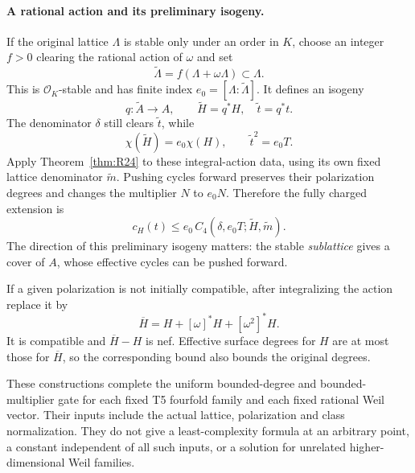 \paragraph{A rational action and its preliminary isogeny.}
If the original lattice $\Lambda$ is stable only under an order in $K$, choose an integer $f>0$ clearing the rational action of $\omega$ and set
\[
\widetilde\Lambda=f(\Lambda+\omega\Lambda)\subset\Lambda.
\]
This is $\mathcal O_K$-stable and has finite index $e_0=[\Lambda:\widetilde\Lambda]$. It defines an isogeny
\[
q:\widetilde A\longrightarrow A,
\qquad \widetilde H=q^*H,\quad\widetilde t=q^*t.
\]
The denominator $\delta$ still clears $\widetilde t$, while
\[
\chi(\widetilde H)=e_0\chi(H),\qquad
\widetilde t^2=e_0T.
\]
Apply Theorem~\ref{thm:R24} to these integral-action data, using its own fixed lattice denominator $\widetilde m$. Pushing cycles forward preserves their polarization degrees and changes the multiplier $N$ to $e_0N$. Therefore the fully charged extension is
\begin{equation}
c_H(t)\leq e_0\,
C_4(\delta,e_0T;\widetilde H,\widetilde m).
\label{eq:rational-action-bound}
\end{equation}
The direction of this preliminary isogeny matters: the stable \emph{sublattice} gives a cover of $A$, whose effective cycles can be pushed forward.

If a given polarization is not initially compatible, after integralizing the action replace it by
\[
\overline H=H+[\omega]^*H+[\omega^2]^*H.
\]
It is compatible and $\overline H-H$ is nef. Effective surface degrees for $H$ are at most those for $\overline H$, so the corresponding bound also bounds the original degrees.

These constructions complete the uniform bounded-degree and bounded-multiplier gate for each fixed T5 fourfold family and each fixed rational Weil vector. Their inputs include the actual lattice, polarization and class normalization. They do not give a least-complexity formula at an arbitrary point, a constant independent of all such inputs, or a solution for unrelated higher-dimensional Weil families.
